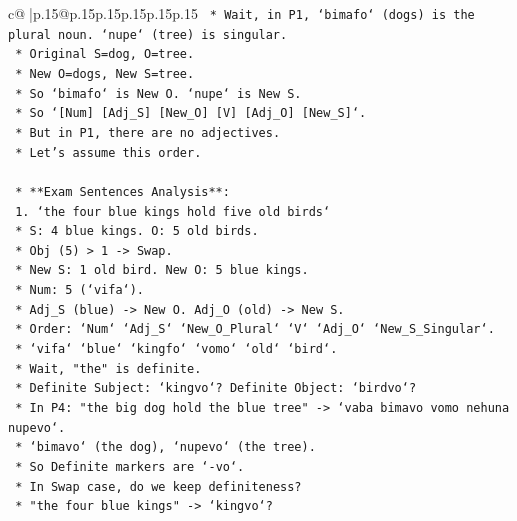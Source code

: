 \documentclass{article}
\begin{document}
{\begin{supertabular}{c@{$\;$}|p{.15\linewidth}@{}p{.15\linewidth}p{.15\linewidth}p{.15\linewidth}p{.15\linewidth}p{.15\linewidth}}
{{{\texttt{                        *   Wait, in P1, `bimafo` (dogs) is the plural noun. `nupe` (tree) is singular.} \\
\texttt{                        *   Original S=dog, O=tree.} \\
\texttt{                        *   New O=dogs, New S=tree.} \\
\texttt{                        *   So `bimafo` is New O. `nupe` is New S.} \\
\texttt{                        *   So `{[}Num{]} {[}Adj\_S{]} {[}New\_O{]} {[}V{]} {[}Adj\_O{]} {[}New\_S{]}`.} \\
\texttt{                        *   But in P1, there are no adjectives.} \\
\texttt{                        *   Let's assume this order.} \\
\\ 
\texttt{    *   **Exam Sentences Analysis**:} \\
\texttt{        1.  `the four blue kings hold five old birds`} \\
\texttt{            *   S: 4 blue kings. O: 5 old birds.} \\
\texttt{            *   Obj (5) > 1 {-}> Swap.} \\
\texttt{            *   New S: 1 old bird. New O: 5 blue kings.} \\
\texttt{            *   Num: 5 (`vifa`).} \\
\texttt{            *   Adj\_S (blue) {-}> New O. Adj\_O (old) {-}> New S.} \\
\texttt{            *   Order: `Num` `Adj\_S` `New\_O\_Plural` `V` `Adj\_O` `New\_S\_Singular`.} \\
\texttt{            *   `vifa` `blue` `kingfo` `vomo` `old` `bird`.} \\
\texttt{            *   Wait, "the" is definite.} \\
\texttt{            *   Definite Subject: `kingvo`? Definite Object: `birdvo`?} \\
\texttt{            *   In P4: "the big dog hold the blue tree" {-}> `vaba bimavo vomo nehuna nupevo`.} \\
\texttt{            *   `bimavo` (the dog), `nupevo` (the tree).} \\
\texttt{            *   So Definite markers are `{-}vo`.} \\
\texttt{            *   In Swap case, do we keep definiteness?} \\
\texttt{            *   "the four blue kings" {-}> `kingvo`?} \\
}}}
\end{supertabular}}
\end{document}
